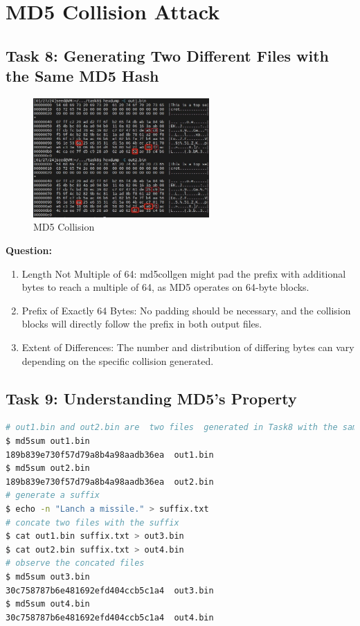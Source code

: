 \documentclass[a4paper,11pt]{article}
\begin{document}
\section{MD5 Collision Attack}
\subsection{Task 8: Generating Two Different Files with the Same MD5 Hash}
\begin{figure}[h]
    \centering
       \includegraphics[width=0.6\textwidth]{figures/task8/md5coll.png}
    \caption{MD5 Collision}\label{fig:task8}
\end{figure}
\textbf{Question:}
\begin{enumerate}
    \item Length Not Multiple of 64: md5collgen might pad the prefix with additional bytes to reach a multiple of 64, as MD5 operates on 64-byte blocks.
    \item Prefix of Exactly 64 Bytes: No padding should be necessary, and the collision blocks will directly follow the prefix in both output files.
    \item Extent of Differences: The number and distribution of differing bytes can vary depending on the specific collision generated.
\end{enumerate}

\subsection{Task 9: Understanding MD5's Property}
\begin{lstlisting}[caption={MD5 Property test script},label={lst:task3.9},language=BASH,breaklines=true]
# out1.bin and out2.bin are  two files  generated in Task8 with the same MD5 hash:
$ md5sum out1.bin
189b839e730f57d79a8b4a98aadb36ea  out1.bin
$ md5sum out2.bin
189b839e730f57d79a8b4a98aadb36ea  out2.bin
# generate a suffix
$ echo -n "Lanch a missile." > suffix.txt
# concate two files with the suffix
$ cat out1.bin suffix.txt > out3.bin
$ cat out2.bin suffix.txt > out4.bin
# observe the concated files
$ md5sum out3.bin
30c758787b6e481692efd404ccb5c1a4  out3.bin
$ md5sum out4.bin
30c758787b6e481692efd404ccb5c1a4  out4.bin
\end{lstlisting} 
\end{document}
